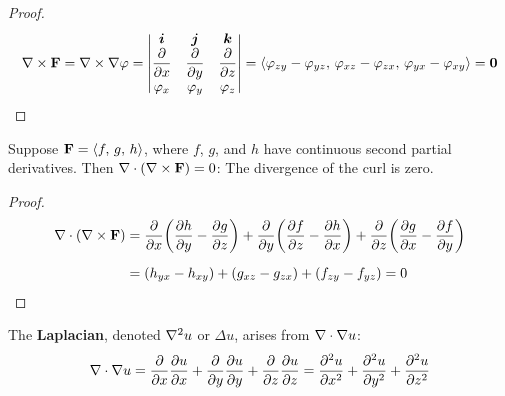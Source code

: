 \documentclass[mathNotesPreamble]{subfiles}
\begin{document}
  \begin{proof}
    \[\nabla\times\mathbf F=\nabla\times\nabla\varphi=
      \begin{vmatrix}
        {\bm{i}}& {\bm{j}}& {\bm{k}}\\
        \dfrac{\partial}{\partial x}& \dfrac{\partial}{\partial y}& \dfrac{\partial}{\partial z}\\
        \varphi_x& \varphi_y& \varphi_z
      \end{vmatrix}
      ={\left\langle 
        \varphi_{zy}-\varphi_{yz},\,
        \varphi_{xz}-\varphi_{zx},\,
        \varphi_{yx}-\varphi_{xy} \right\rangle}
      =\mathbf{0}
    \]
  \end{proof}

  \begin{thmBox*}
    Suppose $\mathbf F={\left\langle f,\,g,\,h \right\rangle}$, where $f$, $g$, and $h$ have continuous second partial derivatives. Then $\nabla\cdot{\left(\nabla\times\mathbf F\right)}=0$: The divergence of the curl is zero.
  \end{thmBox*}
  \begin{proof}
    \begin{align*}
      \nabla\cdot{\left(\nabla\times\mathbf F\right)}&=
        \frac{\partial}{\partial x}{\left(\frac{\partial h}{\partial y}-\frac{\partial g}{\partial z}\right)}+
        \frac{\partial}{\partial y}{\left(\frac{\partial f}{\partial z}-\frac{\partial h}{\partial x}\right)}+
        \frac{\partial}{\partial z}{\left(\frac{\partial g}{\partial x}-\frac{\partial f}{\partial y}\right)}\\[5pt]
        &={\left(h_{yx}-h_{xy}\right)}+{\left(g_{xz}-g_{zx}\right)}+{\left(f_{zy}-f_{yz}\right)}=0
    \end{align*}
  \end{proof}
  \pagebreak

  The \textbf{Laplacian}, denoted $\nabla^2 u$ or $\Delta u$, arises from $\nabla\cdot\nabla u$:
    \[\nabla\cdot\nabla u=\frac{\partial }{\partial x}\frac{\partial u}{\partial x}+\frac{\partial }{\partial y}\frac{\partial u}{\partial y}+\frac{\partial }{\partial z}\frac{\partial u}{\partial z}=\frac{\partial^2 u}{\partial x^2}+\frac{\partial^2 u}{\partial y^2}+\frac{\partial^2 u}{\partial z^2}\]
\end{document}
